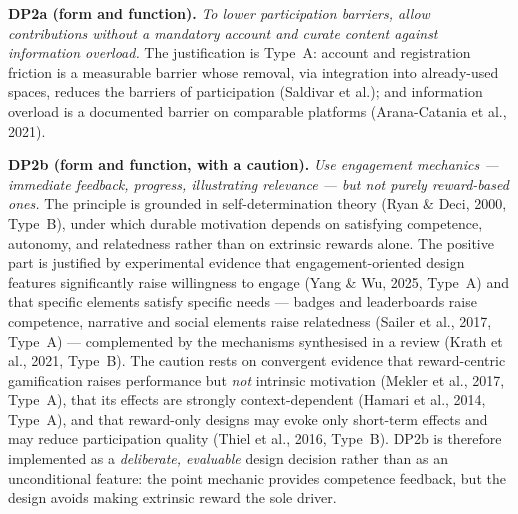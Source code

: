 \documentclass[11pt,a4paper]{article}
\begin{document}
\textbf{DP2a (form and function).} \emph{To lower participation barriers, allow contributions without a mandatory account and curate content against information overload.} The justification is Type~A: account and registration friction is a measurable barrier whose removal, via integration into already-used spaces, reduces the barriers of participation (Saldivar et al.); and information overload is a documented barrier on comparable platforms (Arana-Catania et al., 2021).

\textbf{DP2b (form and function, with a caution).} \emph{Use engagement mechanics --- immediate feedback, progress, illustrating relevance --- but not purely reward-based ones.} The principle is grounded in self-determination theory (Ryan \& Deci, 2000, Type~B), under which durable motivation depends on satisfying competence, autonomy, and relatedness rather than on extrinsic rewards alone. The positive part is justified by experimental evidence that engagement-oriented design features significantly raise willingness to engage (Yang \& Wu, 2025, Type~A) and that specific elements satisfy specific needs --- badges and leaderboards raise competence, narrative and social elements raise relatedness (Sailer et al., 2017, Type~A) --- complemented by the mechanisms synthesised in a review (Krath et al., 2021, Type~B). The caution rests on convergent evidence that reward-centric gamification raises performance but \emph{not} intrinsic motivation (Mekler et al., 2017, Type~A), that its effects are strongly context-dependent (Hamari et al., 2014, Type~A), and that reward-only designs may evoke only short-term effects and may reduce participation quality (Thiel et al., 2016, Type~B). DP2b is therefore implemented as a \emph{deliberate, evaluable} design decision rather than as an unconditional feature: the point mechanic provides competence feedback, but the design avoids making extrinsic reward the sole driver.
\end{document}
